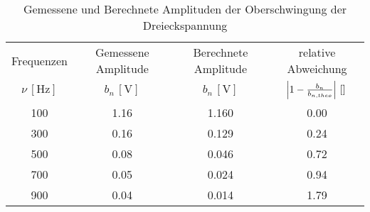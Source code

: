 \begin{table}[!h]
	\centering
	\begin{tabular}{|c|c|c|c|}
		\hline
		Frequenzen & Gemessene Amplitude & Berechnete Amplitude & relative Abweichung\\
		$\nu\,[\si{\hertz}]$ & $b_{n}\,[\si{\volt}]$ & $b_{n}\,[\si{\volt}]$ & $\envert{1 - \tfrac{b_{n}}{b_{n,theo}}}\,[\si{}]$\\\hline\hline
		\num{100}  & \num{1.16}  & \num{1.160}  & \num{0.00} \\
		\num{300}  & \num{0.16}  & \num{0.129}  & \num{0.24} \\
		\num{500}  & \num{0.08}  & \num{0.046}  & \num{0.72} \\
		\num{700}  & \num{0.05}  & \num{0.024}  & \num{0.94} \\
		\num{900}  & \num{0.04}  & \num{0.014}  & \num{1.79} \\
		\hline
	\end{tabular}
	\caption{Gemessene und Berechnete Amplituden der Oberschwingung der Dreieckspannung \label{tab:Analyse2}}
\end{table}